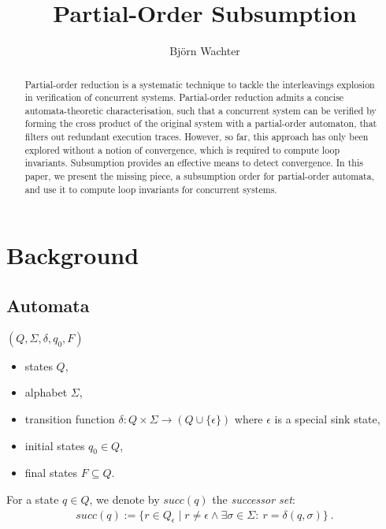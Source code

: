 \documentclass[envcountsame]{llncs}%
\title{Partial-Order Subsumption}
\author{Bj\"orn Wachter}
\institute{Department of Computer Science, Oxford}
\begin{document}
\maketitle

\begin{abstract}
  Partial-order reduction is a systematic technique
  to tackle the interleavings explosion in verification
  of concurrent systems.
  Partial-order reduction admits a concise automata-theoretic
  characterisation, such that a concurrent system
  can be verified by forming the cross product
  of the original system with a partial-order automaton,
  that filters out redundant execution traces.
  However, so far, this approach has only been explored
  without a notion of convergence, which is required
  to compute loop invariants.
  Subsumption provides an effective means to detect
  convergence. 
  In this paper, we present the missing piece, a subsumption
  order for partial-order automata, and use it to
  compute loop invariants for concurrent systems.
\end{abstract}


\section{Background}

\subsection{Automata}

\begin{definition}[Automaton]
  $(Q,\Sigma,\delta,q_0,F)$
  \begin{itemize}
    \item states $Q$,
    \item alphabet $\Sigma$,
    \item transition function $\delta:Q\times \Sigma \to (Q \cup \{\epsilon\})$
    where $\epsilon$ is a special sink state,
    \item initial states $q_0\in Q$,
    \item final states $F\subseteq Q$.
  \end{itemize}
\end{definition}

For a state $q\in Q$, we denote by $succ(q)$ the \emph{successor set}:
\begin{align*}
  succ(q):=\{r\in Q_\epsilon \mid r\neq \epsilon \wedge \exists \sigma \in \Sigma:\ r=\delta(q,\sigma)\} \ .
\end{align*}
\end{document}
